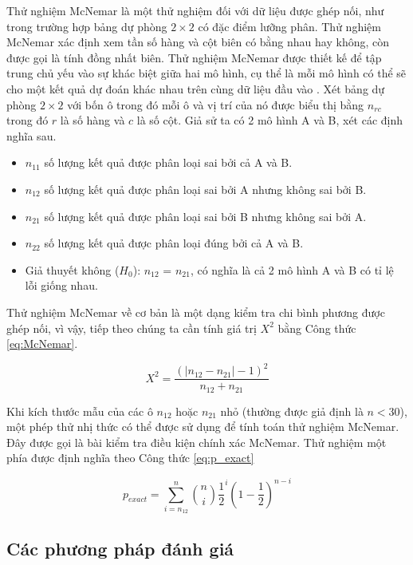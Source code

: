 \documentclass[../the.tex]{subfiles}
\begin{document}
Thử nghiệm McNemar \cite{McNemar1947} là một thử nghiệm đối với dữ liệu được ghép nối, như trong trường hợp bảng dự phòng $2 \times 2$ có đặc điểm lưỡng phân. Thử nghiệm McNemar xác định xem tần số hàng và cột biên có bằng nhau hay không, còn được gọi là tính đồng nhất biên. Thử nghiệm McNemar được thiết kế để tập trung chủ yếu vào sự khác biệt giữa hai mô hình, cụ thể là mỗi mô hình có thể sẽ cho một kết quả dự đoán khác nhau trên cùng dữ liệu đầu vào . Xét bảng dự phòng $2 \times 2$ với bốn ô trong đó mỗi ô và vị trí của nó được biểu thị bằng $n_{rc}$ trong đó $r$ là số hàng và $c$ là số cột. Giả sử ta có 2 mô hình A và B, xét các định nghĩa sau.

\begin {itemize}
\item $n_{11}$ số lượng kết quả được phân loại sai bởi cả A và B.
\item $n_{12}$ số lượng kết quả được phân loại sai bởi A nhưng không sai bởi B.
\item $n_{21}$ số lượng kết quả được phân loại sai bởi B nhưng không sai bởi A.
\item $n_{22}$ số lượng kết quả được phân loại đúng bởi cả A và B.
\item Giả thuyết không ($H_0$): $n_{12}$ = $n_{21}$, có nghĩa là cả 2 mô hình A và B có tỉ lệ lỗi giống nhau.
\end {itemize}

Thử nghiệm McNemar về cơ bản là một dạng kiểm tra chi bình phương được ghép nối, vì vậy, tiếp theo chúng ta cần tính giá trị $X^2$ bằng Công thức \ref{eq:McNemar}.

\begin{equation}
	X^2 = \frac{(|n_{12} - n_{21}| - 1)^2}{n_{12} + n_{21}}
	\label{eq:McNemar}
\end{equation}

Khi kích thước mẫu của các ô $n_{12}$ hoặc $n_{21}$ nhỏ (thường được giả định là $n < 30$), một phép thử nhị thức có thể được sử dụng để tính toán thử nghiệm McNemar. Đây được gọi là bài kiểm tra điều kiện chính xác McNemar. Thử nghiệm một phía được định nghĩa theo Công thức \ref{eq:p_exact}

\begin{equation}
	p_{exact} = \sum_{i=n_{12}}^{n} \binom{n}{i} \frac{1}{2}^i (1 - \frac{1}{2})^{n-i}
	\label{eq:p_exact}
\end{equation}

\subsection{Các phương pháp đánh giá}
\end{document}
